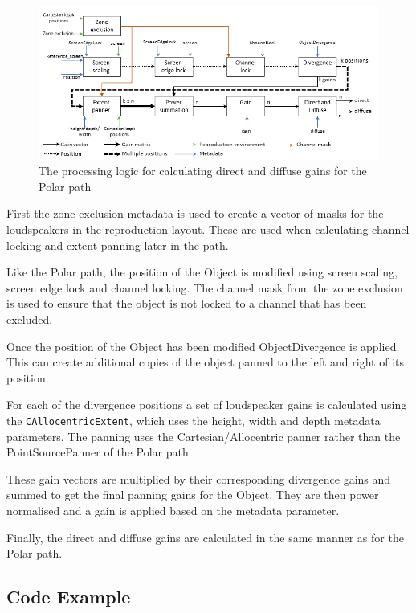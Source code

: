 \documentclass[12pt]{report}
\newcommand{\code}[1]{\texttt{#1}}
\begin{document}
\begin{figure}
    \centering
    \includegraphics[width = \textwidth]{figures/ObjectPannerSignalFlowCartesian.png}
    \caption{The processing logic for calculating direct and diffuse gains for the Polar path}
    \label{fig:adm_object_cartesian}
\end{figure}

First the zone exclusion metadata is used to create a vector of masks for the loudspeakers in the reproduction layout.
These are used when calculating channel locking and extent panning later in the path.

Like the Polar path, the position of the Object is modified using screen scaling, screen edge lock and channel locking.
The channel mask from the zone exclusion is used to ensure that the object is not locked to a channel that has been excluded.

Once the position of the Object has been modified ObjectDivergence is applied.
This can create additional copies of the object panned to the left and right of its position.

For each of the divergence positions a set of loudspeaker gains is calculated using the \code{CAllocentricExtent}, which uses the height, width and depth metadata parameters.
The panning uses the Cartesian/Allocentric panner rather than the PointSourcePanner of the Polar path.

These gain vectors are multiplied by their corresponding divergence gains and summed to get the final panning gains for the Object.
They are then power normalised and a gain is applied based on the metadata parameter.

Finally, the direct and diffuse gains are calculated in the same manner as for the Polar path.

\subsection{Code Example}
\end{document}
